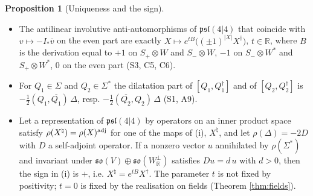 \documentclass[11pt]{article}
\theoremstyle{definition}
\newtheorem{proposition}[definition]{Proposition}
\begin{document}
\begin{proposition}[Uniqueness and the sign]
\label{prop:sign}
\begin{itemize}
\item[(i)] The antilinear involutive anti-automorphisms of $\mathfrak{psl}(4|4)$ that coincide with $v\mapsto-I_*\bar v$ on the even part are exactly $X\mapsto e^{tB}\big((\pm1)^{|X|}X^\dagger\big)$, $t\in\mathbb R$, where $B$ is the derivation equal to $+1$ on $S_+\otimes W$ and $S_-\otimes W$, $-1$ on $S_-\otimes W^*$ and $S_+\otimes W^*$, $0$ on the even part (S3, C5, C6).
\item[(ii)] For $Q_1\in\Sigma$ and $Q_2\in\Sigma^*$ the dilatation part of $[Q_1,Q_1^\dagger]$ and of $[Q_2,Q_2^\dagger]$ is $-\tfrac12(Q_1,\overline{Q_1})\,\Delta$, resp. $-\tfrac12(\overline{Q_2},Q_2)\,\Delta$ (S1, A9).
\item[(iii)] Let a representation of $\mathfrak{psl}(4|4)$ by operators on an inner product space satisfy $\rho(X^\natural)=\rho(X)^{\rm adj}$ for one of the maps of (i), $X^\natural$, and let $\rho(\Delta)=-2D$ with $D$ a self-adjoint operator. If a nonzero vector $u$ annihilated by $\rho(\Sigma^*)$ and invariant under $\mathfrak{so}(V)\oplus\mathfrak{so}(W_{\mathbb R}^\perp)$ satisfies $Du=d\,u$ with $d>0$, then the sign in (i) is $+$, i.e. $X^\natural=e^{tB}X^\dagger$. The parameter $t$ is not fixed by positivity; $t=0$ is fixed by the realisation on fields (Theorem \ref{thm:fields}).
\end{itemize}
\end{proposition}
\end{document}
